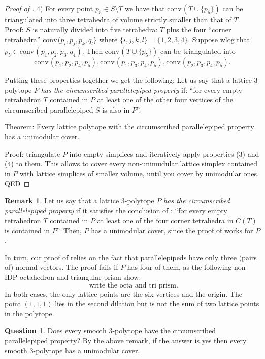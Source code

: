 \documentclass{amsart}
\theoremstyle{plain}
\theoremstyle{definition}
\newtheorem{question}[theorem]{Question}
\newtheorem{remark}[theorem]{Remark}
\newcommand{\conv}{\ensuremath{\mathrm{conv}}\hspace{1pt}}
\newcommand{\paco}[1]{\todo[size=\tiny,color=green!30]{#1 \\ \hfill --- P.}}
\begin{document}
\begin{proof}[Proof of ]
\paco{rewrite}
4) For every point $p_5 \in S \setminus T$ we have that $\conv(T\cup \{p_5\})$ can be triangulated into three tetrahedra of volume strictly smaller than that of $T$. Proof: $S$ is naturally divided into five tetrahedra: $T$ plus the four ``corner tetrahedra'' $\conv(p_i,p_j,p_k,q_l\}$ where $\{i,j,k,l\}= \{1,2,3,4\}$. Suppose wlog that $p_5 \in \conv(p_1,p_2,p_3, q_4)$. Then $\conv(T\cup \{p_5\})$ can be triangulated into 
\[
\conv(p_1,p_2,p_4, p_5),
\conv(p_1,p_3,p_4, p_5),
\conv(p_2,p_3,p_4, p_5).
\]

Putting these properties together we get the following: Let us say that a lattice $3$-polytope $P$ \emph{has the circumscribed parallelepiped property} if: ``for every empty tetrahedron $T$ contained in $P$ at least one of the other four vertices of the circumscribed parallelepiped $S$ is also in $P$''.

Theorem: Every lattice polytope with the circumscribed parallelepiped property has a unimodular cover.

Proof: triangulate $P$ into empty simplices and iteratively apply properties (3) and (4) to them. This allows to cover every non-unimudular lattice simplex contained in $P$ with lattice simplices of smaller volume, until you cover by unimodular ones. QED
\end{proof}

\begin{remark}
\label{rem:octahedra_and_tri-prisms}
Let us say that a lattice $3$-polytope $P$ \emph{has the circumscribed parallelepiped property} if it satisfies the conclusion of :  ``for every empty tetrahedron $T$ contained in $P$ at least one of the four corner tetrahedra in $C(T)$ is 
contained in $P$''. Then, $P$ has a unimodular cover, since the proof of  works for $P$.

In turn, our proof of  relies on the fact that parallelepipeds have only three (pairs of) normal vectors. The proof fails if $P$ has four of them, as the following non-IDP octahedron and triangular prism show:
\[
\text{ write the octa and tri prism}.
\]
In both cases, the only lattice points are the six vertices and the origin. The point $(1,1,1)$ lies in the second dilation but is not the sum of two lattice points in the polytope.
\end{remark}

\begin{question}
Does every smooth 3-polytope have the circumscribed parallelepiped property? By the above remark, if the answer is yes then every smooth $3$-polytope has a unimodular cover.
\end{question}
\end{document}
